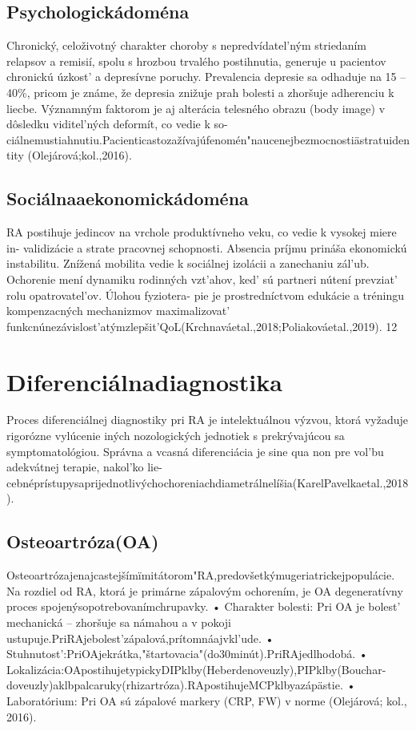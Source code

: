 \subsection{Psychologickádoména}

Chronický, celoživotný charakter choroby s nepredvídatel’ným striedaním relapsov a remisií, spolu s hrozbou trvalého postihnutia, generuje u pacientov chronickú úzkost’ a depresívne poruchy. Prevalencia depresie sa odhaduje na 15 -- 40\%, pricom je známe, že depresia znižuje prah bolesti a zhoršuje adherenciu k liecbe. Významným faktorom je aj alterácia telesného obrazu (body image) v dôsledku viditel’ných deformít, co vedie k so- ciálnemustiahnutiu.Pacienticastozažívajúfenomén"naucenejbezmocnostiästratuidentity (Olejárová;kol.,2016).


\subsection{Sociálnaaekonomickádoména}

RA postihuje jedincov na vrchole produktívneho veku, co vedie k vysokej miere in- validizácie a strate pracovnej schopnosti. Absencia príjmu prináša ekonomickú instabilitu. Znížená mobilita vedie k sociálnej izolácii a zanechaniu zál’ub. Ochorenie mení dynamiku rodinných vzt’ahov, ked’ sú partneri nútení prevziat’ rolu opatrovatel’ov. Úlohou fyziotera- pie je prostredníctvom edukácie a tréningu kompenzacných mechanizmov maximalizovat’ funkcnúnezávislost’atýmzlepšit’QoL(Krchnaváetal.,2018;Poliakováetal.,2019). 12


\section{Diferenciálnadiagnostika}

Proces diferenciálnej diagnostiky pri RA je intelektuálnou výzvou, ktorá vyžaduje rigorózne vylúcenie iných nozologických jednotiek s prekrývajúcou sa symptomatológiou. Správna a vcasná diferenciácia je sine qua non pre vol’bu adekvátnej terapie, nakol’ko lie- cebnéprístupysaprijednotlivýchochoreniachdiametrálnelíšia(KarelPavelkaetal.,2018).


\subsection{Osteoartróza(OA)}

Osteoartrózajenajcastejšímïmitátorom"RA,predovšetkýmugeriatrickejpopulácie. Na rozdiel od RA, ktorá je primárne zápalovým ochorením, je OA degeneratívny proces spojenýsopotrebovanímchrupavky. • Charakter bolesti: Pri OA je bolest’ mechanická -- zhoršuje sa námahou a v pokoji ustupuje.PriRAjebolest’zápalová,prítomnáajvkl’ude. • Stuhnutost’:PriOAjekrátka,"štartovacia"(do30minút).PriRAjedlhodobá. • Lokalizácia:OApostihujetypickyDIPklby(Heberdenoveuzly),PIPklby(Bouchar- doveuzly)aklbpalcaruky(rhizartróza).RApostihujeMCPklbyazápästie. • Laboratórium: Pri OA sú zápalové markery (CRP, FW) v norme (Olejárová; kol., 2016).


